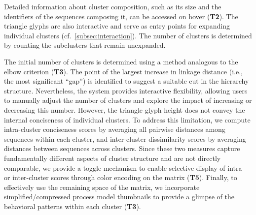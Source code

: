 \documentclass[preprint,journal]{vgtc}            %
\begin{document}
Detailed information about cluster composition, such as its size and the identifiers of the sequences composing it, can be accessed on hover (\textbf{T2}). 
The triangle glyphs are also interactive and serve as entry points for expanding individual clusters (cf.~\cref{subsec:interaction}). 
The number of clusters is determined by counting the subclusters that remain unexpanded.

The initial number of clusters is determined using a method analogous to the elbow criterion (\textbf{T3}).
The point of the largest increase in linkage distance (i.e., the most significant ``gap'') is identified to suggest a suitable cut in the hierarchy structure. 
Nevertheless, the system provides interactive flexibility, allowing users to manually adjust the number of clusters and explore the impact of increasing or decreasing this number.
However, the triangle glyph height does not convey the internal conciseness of individual clusters. 
To address this limitation, we compute intra-cluster conciseness scores by averaging all pairwise distances among sequences within each cluster, and inter-cluster dissimilarity scores by averaging distances between sequences across clusters.
Since these two measures capture fundamentally different aspects of cluster structure and are not directly comparable, we provide a toggle mechanism to enable selective display of intra- or inter-cluster scores through color encoding on the matrix (\textbf{T5}).
Finally, to effectively use the remaining space of the matrix, we incorporate simplified/compressed process model thumbnails to provide a glimpse of the behavioral patterns within each cluster (\textbf{T3}). 
\end{document}
